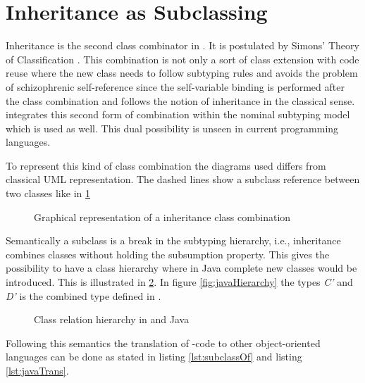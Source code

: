\section{Inheritance as Subclassing}
Inheritance is the second class combinator in \ooplss. It is postulated
by Simons' Theory of Classification \cite{simons_theory_2004-2}.
This combination is not only a sort of class extension with code
reuse where the new class needs to follow subtyping rules and avoids
the problem of schizophrenic self-reference since the self-variable
binding is performed after the class combination and follows the notion
of inheritance in the classical sense. \ooplss integrates this second
form of combination within the nominal subtyping model which is used as
well. This dual possibility is unseen in current programming languages.

To represent this kind of class combination the diagrams used differs from classical
UML representation. The dashed lines show a subclass reference between two classes
like in \cref{fig:subclassCombination}

\begin{figure}
	\centering
	\caption{Graphical representation of a inheritance class combination}
	\label{fig:subclassCombination}
\end{figure}

Semantically a subclass is a break in the subtyping hierarchy, i.e., inheritance
combines classes without holding the subsumption property. This gives \ooplss
the possibility to have a class hierarchy where in Java complete new classes
would be introduced. This is illustrated in \cref{fig:inheritHierarchy}. In figure
\ref{fig:javaHierarchy} the types \emph{C'} and \emph{D'} is the combined type
defined in \ooplss.

\begin{figure}
	\centering
	\caption{Class relation hierarchy in \ooplss and Java}
	\label{fig:inheritHierarchy}
\end{figure}


Following this semantics the translation of \ooplss-code to
other object-oriented languages can be done as stated in listing
\ref{lst:subclassOf} and listing \ref{lst:javaTrans}.

